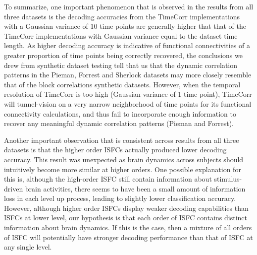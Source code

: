 \documentclass[11pt]{article}
\begin{document}
To summarize, one important phenomenon that is observed in the results from all three datasets is the decoding accuracies from the TimeCorr implementations with a Gaussian variance of 10 time points are generally higher that that of the TimeCorr implementations with Gaussian variance equal to the dataset time length. As higher decoding accuracy is indicative of functional connectivities of a greater proportion of time points being correctly recovered, the conclusions we drew from synthetic dataset testing tell that us that the dynamic correlation patterns in the Pieman, Forrest and Sherlock datasets may more closely resemble that of the block correlations synthetic datasets. However, when the temporal resolution of TimeCorr is too high (Gaussian variance of 1 time point), TimeCorr will tunnel-vision on a very narrow neighborhood of time points for its functional connectivity calculations, and thus fail to incorporate enough information to recover any meaningful dynamic correlation patterns (Pieman and Forrest).

Another important observation that is consistent across results from all three datasets is that the higher order ISFCs actually produced lower decoding accuracy. This result was unexpected as brain dynamics across subjects should intuitively become more similar at higher orders. One possible explanation for this is, although the high-order ISFC still contain information about stimulus-driven brain activities, there seems to have been a small amount of information loss in each level up process, leading to slightly lower classification accuracy. However, although higher order ISFCs display weaker decoding capabilities than ISFCs at lower level, our hypothesis is that each order of ISFC contains distinct information about brain dynamics. If this is the case, then a mixture of all orders of ISFC will potentially have stronger decoding performance than that of ISFC at any single level.
\end{document}
